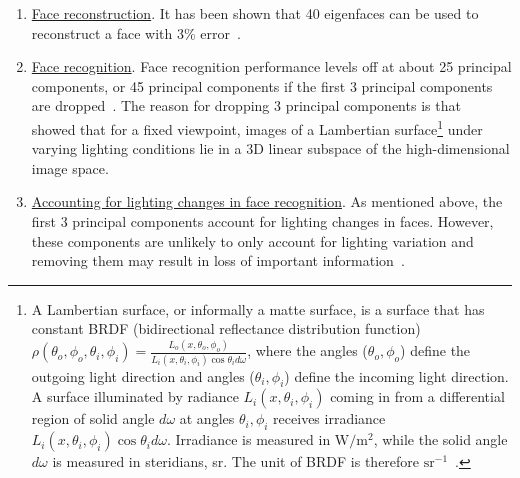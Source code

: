 \begin{enumerate}
\item \underline{Face reconstruction}.  It has been shown that 40 eigenfaces can be used to reconstruct a face with 3\% error~\cite{1987_JNL_Faces_Sirovich}.
\item \underline{Face recognition}.  Face recognition performance levels off at about 25 principal components, or 45 principal components if the first 3 principal components are dropped~\cite{1997_JNL_EigenVsFisherFaces_Bel}.  The reason for dropping 3 principal components is that~\cite{1992_THE_GeoPhoto_Shashua} showed that for a fixed viewpoint, images of a Lambertian surface\footnote{A Lambertian surface, or informally a matte surface, is a surface that has constant BRDF (bidirectional reflectance distribution function) $\rho(\theta_o, \phi_o, \theta_i, \phi_i)=\frac{L_o(x, \theta_o, \phi_o)}{L_i(x, \theta_i, \phi_i)\cos\theta_i d\omega}$, where the angles ($\theta_o, \phi_o$) define the outgoing light direction and angles ($\theta_i, \phi_i$) define the incoming light direction.  A surface illuminated by radiance $L_i(x, \theta_i, \phi_i)$ coming in from a differential region of solid angle $d\omega$ at angles $\theta_i, \phi_i$ receives irradiance $L_i(x, \theta_i, \phi_i)\cos\theta_i d\omega$.  Irradiance is measured in $\mathrm{W/m^2}$, while the solid angle $d\omega$ is measured in steridians, sr.  The unit of BRDF is therefore $\mathrm{sr^{-1}}$~\cite{2002_BOOK_CV_Forsyth}.} under varying lighting conditions lie in a 3D linear subspace of the high-dimensional image space.
\item \underline{Accounting for lighting changes in face recognition}.  As mentioned above, the first 3 principal components account for lighting changes in faces.  However, these components are unlikely to only account for lighting variation and removing them may result in loss of important information~\cite{1997_JNL_EigenVsFisherFaces_Bel}.
\end{enumerate}

